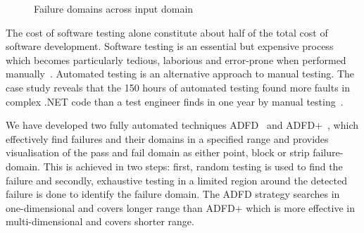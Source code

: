 \documentclass[runningheads,a4paper]{llncs}
\begin{document}
\smallskip
\begin{figure} [H]
\centering
{}
\smallskip
\caption{Failure domains across input domain~\cite{chan1996proportional}}
\label{fig:patterns2}
\end{figure} 


The cost of software testing alone constitute about half of the total cost of software development. Software testing is an essential but expensive process which becomes particularly tedious, laborious and error-prone when performed manually~\cite{Beizer1990}. Automated testing is an alternative approach to manual testing. The case study reveals that the 150 hours of automated testing found more faults in complex .NET code than a test engineer finds in one year by manual testing~\cite{pacheco2008finding}. 

We have developed two fully automated techniques ADFD~\cite{ahmad2013adfd} and ADFD+~\cite{ahmad2014adfd2}, which effectively find failures and their domains in a specified range and provides visualisation of the pass and fail domain as either point, block or strip failure-domain. This is achieved in two steps: first, random testing is used to find the failure and secondly, exhaustive testing in a limited region around the detected failure is done to identify the failure domain. The ADFD strategy searches in one-dimensional and covers longer range than ADFD+ which is more effective in multi-dimensional and covers shorter range.
\end{document}
